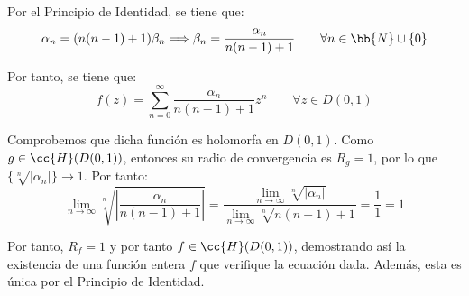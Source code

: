 \documentclass[12pt]{article}
\begin{document}
\begin{ejercicio}[3.5 puntos]
        Por el Principio de Identidad, se tiene que:
        \begin{equation*}
            \alpha_n = (n(n-1)+1)\beta_n\Longrightarrow \beta_n = \frac{\alpha_n}{n(n-1)+1} \qquad \forall n\in\bb{N}\cup \{0\}
        \end{equation*}

        Por tanto, se tiene que:
        \begin{equation*}
            f(z) = \sum_{n=0}^{\infty} \frac{\alpha_n}{n(n-1)+1} z^n \qquad \forall z\in D(0,1)
        \end{equation*}

        Comprobemos que dicha función es holomorfa en $D(0,1)$. Como $g\in \cc{H}(D(0,1))$, entonces su radio de convergencia es $R_g=1$, por lo que $\{\sqrt[n]{|\alpha_n|}\}\to 1$. Por tanto:
        \begin{equation*}
            \lim_{n\to\infty} \sqrt[n]{\left|\frac{\alpha_n}{n(n-1)+1}\right|} = \dfrac{\lim\limits_{n\to\infty} \sqrt[n]{|\alpha_n|}}{\lim\limits_{n\to\infty} \sqrt[n]{n(n-1)+1}} = \dfrac{1}{1} = 1
        \end{equation*}

        Por tanto, $R_f=1$ y por tanto $f\in \cc{H}(D(0,1))$, demostrando así la existencia de una función entera $f$ que verifique la ecuación dada. Además, esta es única por el Principio de Identidad.
    \end{ejercicio}
\end{document}
